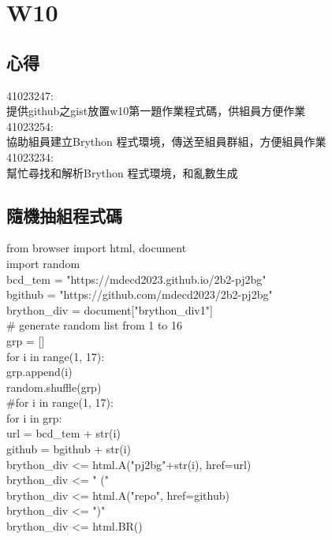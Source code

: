 \chapter{W10}
\section{心得}
 41023247:\\

提供github之gist放置w10第一題作業程式碼，供組員方便作業\\

41023254:\\

協助組員建立Brython 程式環境，傳送至組員群組，方便組員作業\\

41023234:\\

幫忙尋找和解析Brython 程式環境，和亂數生成\\



\newpage
\section{隨機抽組程式碼}
 from browser import html, document\\
import random\\
bcd_tem = "https://mdecd2023.github.io/2b2-pj2bg"\\
bgithub = "https://github.com/mdecd2023/2b2-pj2bg"\\
brython_div = document["brython_div1"]\\
#  generate random list from 1 to 16\\
grp = []\\
for i in range(1, 17):\\
    grp.append(i)\\
random.shuffle(grp)\\
#for i in range(1, 17):\\
for i in grp:\\
    url = bcd_tem + str(i)\\
    github = bgithub + str(i)\\
    brython_div <= html.A("pj2bg"+str(i), href=url)\\
    brython_div <= " ("\\
    brython_div <= html.A("repo", href=github)\\
    brython_div <= ")"\\
    brython_div <= html.BR()\\

\newpage